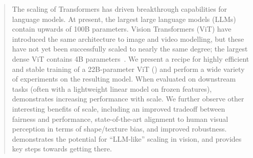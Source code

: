 \begin{abstract}

The scaling of Transformers has driven breakthrough capabilities for language models.
At present, the largest large language models (LLMs) contain upwards of 100B parameters.
Vision Transformers (ViT) have introduced the same architecture to image and video modelling, but these have not yet been successfully scaled to nearly the same degree; the largest dense ViT contains 4B parameters~\citep{chen2022pali}.
We present a recipe for highly efficient and stable training of a 22B-parameter ViT (\chonk) and perform a wide variety of experiments on the resulting model.
When evaluated on downstream tasks (often with a lightweight linear model on frozen features), \chonk demonstrates increasing performance with scale.
We further observe other interesting benefits of scale, including an improved tradeoff between fairness and performance, state-of-the-art alignment to human visual perception in terms of shape/texture bias, and improved robustness.
\chonk demonstrates the potential for ``LLM-like'' scaling in vision, and provides key steps towards getting there.
\end{abstract}
